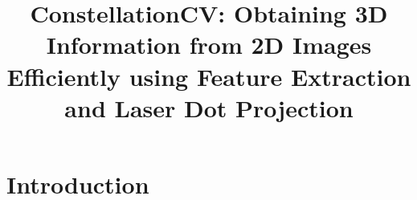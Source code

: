 \documentclass[preprint,12pt]{elsarticle}
\begin{document}
\begin{frontmatter}


\title{ConstellationCV: Obtaining 3D Information from 2D Images Efficiently using Feature Extraction and Laser Dot Projection}




\author{}
\author{}

\address{Bronx, New York}

\begin{abstract}

\end{abstract}





\end{frontmatter}
\pagebreak


\section{Introduction}
\label{S:1}

\end{document}
